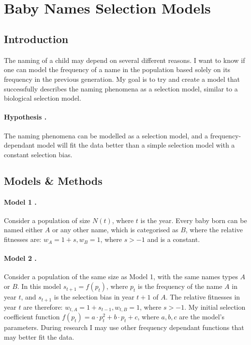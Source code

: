 \documentclass[11pt]{article}
\begin{document}
\section*{Baby Names Selection Models}
\subsection*{Introduction}
\paragraph{} The naming of a child may depend on several different reasons.
I want to know if one can model the frequency of a name in the population based solely on its frequency in the previous generation.
My goal is to try and create a model that successfully describes the naming phenomena as a selection model, similar to a biological selection model.
\paragraph{Hypothesis .} The naming phenomena can be modelled as a selection model, and a frequency-dependant model will fit the data better than a simple selection model with a constant selection bias.

\subsection*{Models \& Methods}
\paragraph{Model 1 .} Consider a population of size $N(t)$, where $t$ is the year.
Every baby born can be named either $A$ or any other name, which is categorised as $B$, where the relative fitnesses are: $w_A=1+s, w_B=1$, where $s > -1$ and is a constant.
\paragraph{Model 2 .} Consider a population of the same size as Model 1, with the same names types $A$ or $B$.
In this model $s_{t+1}=f(p_t)$, where $p_t$ is the frequency of the name $A$ in year $t$, and $s_{t+1}$ is the selection bias in year $t+1$ of $A$.
The relative fitnesses in year $t$ are therefore: $w_{t,A}=1+s_{t-1}, w_{t,B}=1$, where $s > -1$.
My initial selection coefficient function $f(p_t) = a\cdot p^2_t + b\cdot p_t + c$, where $a, b, c$ are the model's parameters.
During research I may use other frequency dependant functions that may better fit the data.
\end{document}
